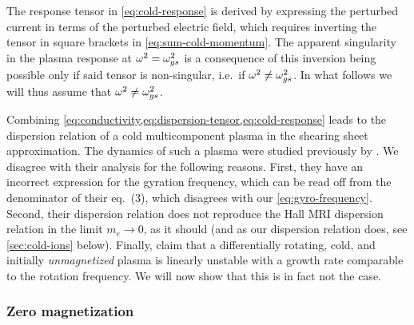 \documentclass[aps,pre,notitlepage,amsmath,amssymb,amsfonts,nobibnotes,nofootinbib]{revtex4-1}
\begin{document}
The response tensor in \cref{eq:cold-response} is derived by expressing the
perturbed current in terms of the perturbed electric field, which requires
inverting  the tensor in square brackets in \cref{eq:sum-cold-momentum}. The
apparent singularity in the plasma response at $\omega^2=\omega_{gs}^2$ is a
consequence of this inversion being possible only if said tensor is
non-singular, i.e.\ if $\omega^2\ne\omega_{gs}^2$. In what follows we will thus
assume that $\omega^2\ne\omega_{gs}^2$. 

Combining \cref{eq:conductivity,eq:dispersion-tensor,eq:cold-response} leads
to the dispersion relation of a cold multicomponent plasma in the shearing
sheet approximation. The dynamics of such a plasma were studied previously by
\citet{Krolik2006}. We disagree with their analysis for the following reasons.
First, they have an incorrect expression for the gyration
frequency, which can be read off from the denominator of their eq.~(3), which
disagrees with our \cref{eq:gyro-frequency}. Second, their dispersion relation
does not reproduce the Hall MRI dispersion relation
\citep{Wardle1999,Balbus2001} in the limit $m_e\to0$, as it should (and as our
dispersion relation does, see \cref{sec:cold-ions} below). Finally,
\citet{Krolik2006} claim that a differentially rotating, cold, and initially
\emph{unmagnetized} plasma is linearly unstable with a growth rate comparable
to the rotation frequency. We will now show that this is in fact not the case.

\subsubsection{Zero magnetization}
\label{sec:zero-mag}
\end{document}
